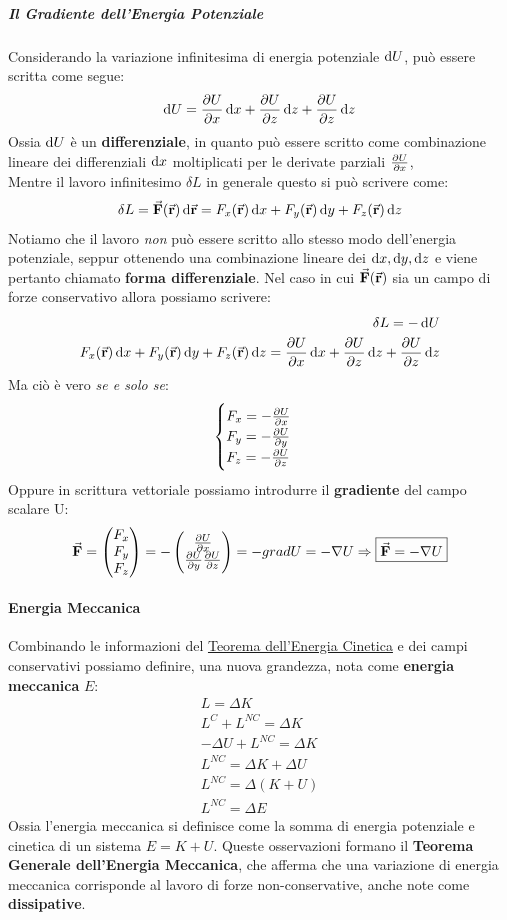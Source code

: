 \documentclass{report}
\newcommand{\then}{\ensuremath{\Rightarrow}}
\renewcommand{\r}{\va{r}}
\newcommand{\F}{\va{F}}
\begin{document}
\subparagraph{Il Gradiente dell'Energia Potenziale}
Considerando la variazione infinitesima di energia potenziale $\dif U$, può essere scritta come segue:
\[\dif U=\pdv{U}{x}\dif x+\pdv{U}{z}\dif z+\pdv{U}{z}\dif z\]
Ossia $\dif U$ è un \textbf{differenziale}, in quanto può essere scritto come combinazione lineare dei differenziali $\dif x$ moltiplicati per le derivate parziali $\pdv{U}{x}$,\\
Mentre il lavoro infinitesimo $\delta L$ in generale questo si può scrivere come:
\[\delta L=\F(\r)\dif\r=F_x(\r)\dif x+F_y(\r)\dif y+F_z(\r)\dif z\]
Notiamo che il lavoro \textit{non} può essere scritto allo stesso modo dell'energia potenziale, seppur ottenendo una combinazione lineare dei $\dif x,\dif y,\dif z$ e viene pertanto chiamato \textbf{forma differenziale}. Nel caso in cui $\F(\r)$ sia un campo di forze conservativo allora possiamo scrivere:
\begin{align*}
    \delta L=-\dif U\\
    F_x(\r)\dif x+F_y(\r)\dif y+F_z(\r)\dif z=\pdv{U}{x}\dif x+\pdv{U}{z}\dif z+\pdv{U}{z}\dif z
\end{align*}
Ma ciò è vero \textit{se e solo se}:
\begin{equation}
\begin{cases}
    F_x=-\pdv{U}{x}\\
    F_y=-\pdv{U}{y}\\
    F_z=-\pdv{U}{z}
\end{cases}
\end{equation}
Oppure in scrittura vettoriale possiamo introdurre il \textbf{gradiente} del campo scalare U:
\begin{equation}
\F=
\begin{pmatrix}
F_x\\F_y\\F_z
\end{pmatrix}=
-\begin{pmatrix}
\pdv{U}{x}\\\pdv{U}{y}\pdv{U}{z}
\end{pmatrix}=-grad U=-\nabla U
\then\boxed{\F=-\nabla U}
\end{equation}
\paragraph{Energia Meccanica}
Combinando le informazioni del \hyperlink{ForzeVive}{Teorema dell'Energia Cinetica} e dei campi conservativi possiamo definire, una nuova grandezza, nota come \textbf{energia meccanica} $E$:
\begin{align*}
    L=\Delta K\\
    L^C+L^{NC}=\Delta K\\
    -\Delta U+L^{NC}=\Delta K\\
    L^{NC}=\Delta K+\Delta U\\
    L^{NC}=\Delta (K+U)\\
    \boxed{L^{NC}=\Delta E}
\end{align*}
Ossia l'energia meccanica si definisce come la somma di energia potenziale e cinetica di un sistema $E=K+U$. Queste osservazioni formano il \textbf{Teorema Generale dell'Energia Meccanica}, che afferma che una variazione di energia meccanica corrisponde al lavoro di forze non-conservative, anche note come \textbf{dissipative}.
\end{document}
